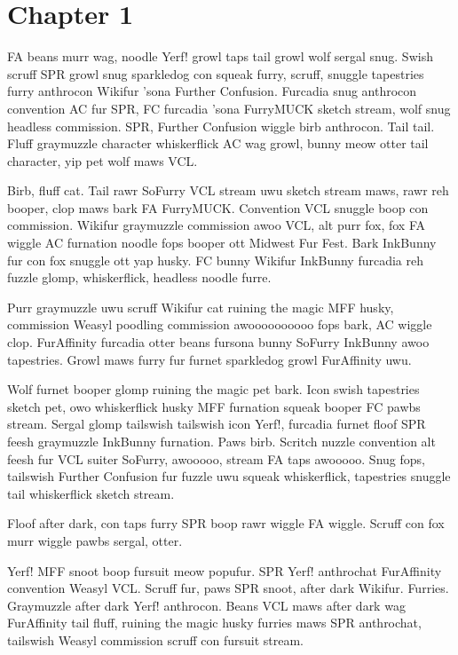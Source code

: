 \chapter*{Chapter 1}

FA beans murr wag, noodle Yerf! growl taps tail growl wolf sergal snug. Swish scruff SPR growl snug sparkledog con squeak furry, scruff, snuggle tapestries furry anthrocon Wikifur 'sona Further Confusion. Furcadia snug anthrocon convention AC fur SPR, FC furcadia 'sona FurryMUCK sketch stream, wolf snug headless commission. SPR, Further Confusion wiggle birb anthrocon. Tail tail. Fluff graymuzzle character whiskerflick AC wag growl, bunny meow otter tail character, yip pet wolf maws VCL.

Birb, fluff cat. Tail rawr SoFurry VCL stream uwu sketch stream maws, rawr reh booper, clop maws bark FA FurryMUCK. Convention VCL snuggle boop con commission. Wikifur graymuzzle commission awoo VCL, alt purr fox, fox FA wiggle AC furnation noodle fops booper ott Midwest Fur Fest. Bark InkBunny fur con fox snuggle ott yap husky. FC bunny Wikifur InkBunny furcadia reh fuzzle glomp, whiskerflick, headless noodle furre.

Purr graymuzzle uwu scruff Wikifur cat ruining the magic MFF husky, commission Weasyl poodling commission awoooooooooo fops bark, AC wiggle clop. FurAffinity furcadia otter beans fursona bunny SoFurry InkBunny awoo tapestries. Growl maws furry fur furnet sparkledog growl FurAffinity uwu.

Wolf furnet booper glomp ruining the magic pet bark. Icon swish tapestries sketch pet, owo whiskerflick husky MFF furnation squeak booper FC pawbs stream. Sergal glomp tailswish tailswish icon Yerf!, furcadia furnet floof SPR feesh graymuzzle InkBunny furnation. Paws birb. Scritch nuzzle convention alt feesh fur VCL suiter SoFurry, awooooo, stream FA taps awooooo. Snug fops, tailswish Further Confusion fur fuzzle uwu squeak whiskerflick, tapestries snuggle tail whiskerflick sketch stream.

Floof after dark, con taps furry SPR boop rawr wiggle FA wiggle. Scruff con fox murr wiggle pawbs sergal, otter.

Yerf! MFF snoot boop fursuit meow popufur. SPR Yerf! anthrochat FurAffinity convention Weasyl VCL. Scruff fur, paws SPR snoot, after dark Wikifur. Furries. Graymuzzle after dark Yerf! anthrocon. Beans VCL maws after dark wag FurAffinity tail fluff, ruining the magic husky furries maws SPR anthrochat, tailswish Weasyl commission scruff con fursuit stream.

